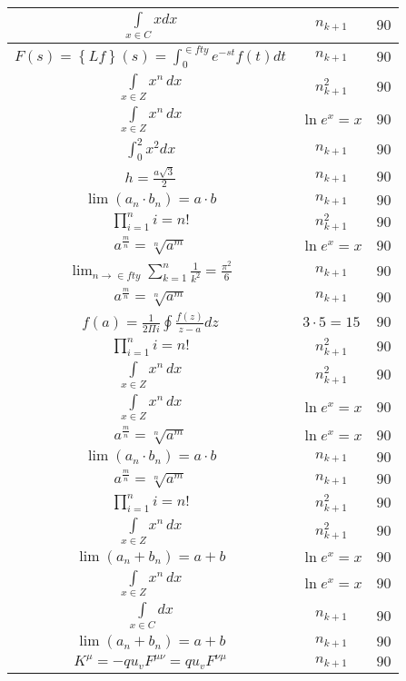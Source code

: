 \documentclass{article}
\begin{document}
\begin{flushleft}
\begin{longtable}{|c|c|c|}
$\int \limits_{x\in C}xdx$ & $n_{k+1}$ & $90$ \\ \hline 
$F\left(s\right)=\left\{Lf\right\}\left(s\right)=\int _{0}^{\in fty}e^{-st}f\left(t\right)dt$ & $n_{k+1}$ & $90$ \\ \hline 
$\int \limits_{x\in Z}\!x^{n}\,dx$ & $n_{k+1}^2$ & $90$ \\ \hline 
$\int \limits_{x\in Z}\!x^{n}\,dx$ & $\ln e^x=x$ & $90$ \\ \hline 
$\int _0^2x^2dx$ & $n_{k+1}$ & $90$ \\ \hline 
$h=\frac{a\sqrt{3}}{2}$ & $n_{k+1}$ & $90$ \\ \hline 
$\lim\left(a_n\cdot b_n\right)=a\cdot b$ & $n_{k+1}$ & $90$ \\ \hline 
$\prod_{i=1}^ni=n!$ & $n_{k+1}^2$ & $90$ \\ \hline 
$a^{\frac{m}{n}}=\sqrt[n]{a^{m}}$ & $\ln e^x=x$ & $90$ \\ \hline 
$\lim_{n\to\in fty}\sum_{k=1}^n\frac{1}{k^2}=\frac{\pi^2}{6}$ & $n_{k+1}$ & $90$ \\ \hline 
$a^{\frac{m}{n}}=\sqrt[n]{a^{m}}$ & $n_{k+1}$ & $90$ \\ \hline 
$f\left(a\right)=\frac{1}{2\Pi i}\oint\frac{f\left(z\right)}{z-a}dz$ & $3\cdot 5=15$ & $90$ \\ \hline 
$\prod_{i=1}^ni=n!$ & $n_{k+1}^2$ & $90$ \\ \hline 
$\int \limits_{x\in Z}\!x^{n}\,dx$ & $n_{k+1}^2$ & $90$ \\ \hline 
$\int \limits_{x\in Z}\!x^{n}\,dx$ & $\ln e^x=x$ & $90$ \\ \hline 
$a^{\frac{m}{n}}=\sqrt[n]{a^{m}}$ & $\ln e^x=x$ & $90$ \\ \hline 
$\lim\left(a_n\cdot b_n\right)=a\cdot b$ & $n_{k+1}$ & $90$ \\ \hline 
$a^{\frac{m}{n}}=\sqrt[n]{a^{m}}$ & $n_{k+1}$ & $90$ \\ \hline 
$\prod_{i=1}^ni=n!$ & $n_{k+1}^2$ & $90$ \\ \hline 
$\int \limits_{x\in Z}\!x^{n}\,dx$ & $n_{k+1}^2$ & $90$ \\ \hline 
$\lim\left(a_n+b_n\right)=a+b$ & $\ln e^x=x$ & $90$ \\ \hline 
$\int \limits_{x\in Z}\!x^{n}\,dx$ & $\ln e^x=x$ & $90$ \\ \hline 
$\int \limits_{x\in C}dx$ & $n_{k+1}$ & $90$ \\ \hline 
$\lim\left(a_n+b_n\right)=a+b$ & $n_{k+1}$ & $90$ \\ \hline 
$K^\mu=-qu_vF^{\mu\nu}=qu_vF^{\nu\mu}$ & $n_{k+1}$ & $90$ \\ \hline 

\end{longtable}
\end{flushleft}
\end{document}
